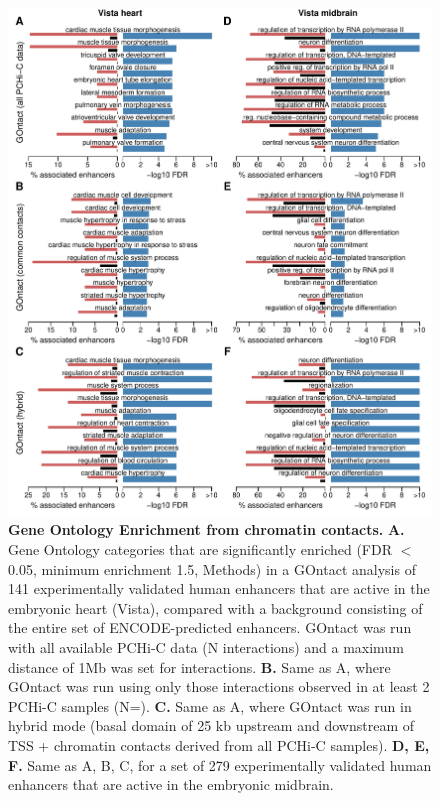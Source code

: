 \begin{figure}[hbt!]
    \centering
    \includegraphics[width=1\textwidth, page=1] {figures/GOntact/Figure3.pdf}
    \caption[Gene Ontology Enrichment from chromatin contacts.]{
    \textbf{Gene Ontology Enrichment from chromatin contacts.}
    \textbf{A.} Gene Ontology categories that are significantly enriched (FDR $<$ 0.05, minimum enrichment 1.5, Methods) in a GOntact analysis of 141 experimentally validated human enhancers that are active in the embryonic heart (Vista), compared with a background consisting of the entire set of ENCODE-predicted enhancers. GOntact was run with all available PCHi-C data (N interactions) and a maximum distance of 1Mb was set for interactions.
    \textbf{B.} Same as A, where GOntact was run using only those interactions observed in at least 2 PCHi-C samples (N=). 
    \textbf{C.} Same as A, where GOntact was run in hybrid mode (basal domain of 25 kb upstream and downstream of TSS + chromatin contacts derived from all PCHi-C samples). 
    \textbf{D, E, F.} Same as A, B, C, for a set of 279 experimentally validated human enhancers that are active in the embryonic midbrain. 
    \\
    }
    \label{fig:GOntact-fig3}
\end{figure} 


